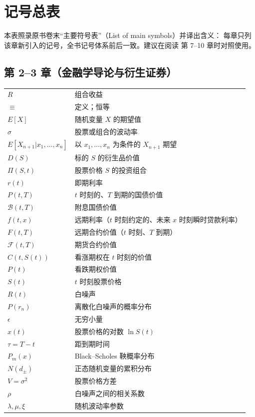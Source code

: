 \chapter{记号总表}

本表照录原书卷末“主要符号表”（List of main symbols）并译出含义：
每章只列该章新引入的记号，全书记号体系前后一致。建议在阅读
第 7--10 章时对照使用。

\section*{第 2--3 章（金融学导论与衍生证券）}

\begin{center}
\begin{tabular}{@{}L{3.2cm}L{10.6cm}@{}}
\toprule
$R$ & 组合收益 \\
$\equiv$ & 定义；恒等 \\
$E[X]$ & 随机变量 $X$ 的期望值 \\
$\sigma$ & 股票或组合的波动率 \\
$E[X_{n+1}|x_1,\dots,x_n]$ & 以 $x_1,\dots,x_n$ 为条件的 $X_{n+1}$ 期望 \\
$D(S)$ & 标的 $S$ 的衍生品价值 \\
$\Pi(S,t)$ & 股票价格 $S$ 的投资组合 \\
$r(t)$ & 即期利率 \\
$P(t,T)$ & $t$ 时刻的、$T$ 到期的国债价值 \\
$\mathcal{B}(t,T)$ & 附息国债价值 \\
$f(t,x)$ & 远期利率（$t$ 时刻约定的、未来 $x$ 时刻瞬时贷款利率） \\
\midrule
$F(t,T)$ & 远期合约价值（$t$ 时刻、$T$ 到期） \\
$\mathcal{F}(t,T)$ & 期货合约价值 \\
$C(t,S(t))$ & 看涨期权在 $t$ 时刻的价值 \\
$P(t)$ & 看跌期权价值 \\
$S(t)$ & $t$ 时刻股票价格 \\
$R(t)$ & 白噪声 \\
$P(r_n)$ & 离散化白噪声的概率分布 \\
$\epsilon$ & 无穷小量 \\
$x(t)$ & 股票价格的对数 $\ln S(t)$ \\
$\tau=T-t$ & 距到期时间 \\
$P_m(x)$ & Black--Scholes 鞅概率分布 \\
$N(d_{\pm})$ & 正态随机变量的累积分布 \\
$V=\sigma^2$ & 股票价格方差 \\
$\rho$ & 白噪声之间的相关系数 \\
$\lambda,\mu,\xi$ & 随机波动率参数 \\
\bottomrule
\end{tabular}
\end{center}


